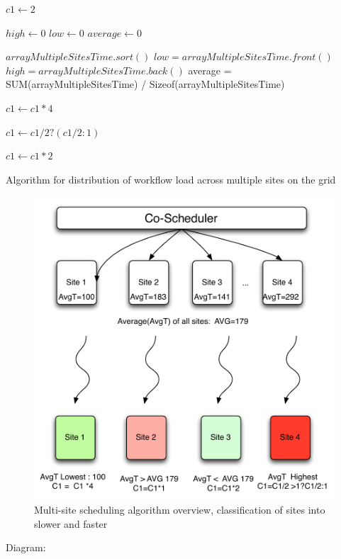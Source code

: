 \documentclass[ms,electronic,double]{nuthesis}
\begin{document}
\begin{algorithm}
\begin{algorithmic}

\STATE $c1 \gets 2$ 

\STATE $high \gets 0$
\STATE $low \gets 0$
\STATE $average \gets 0$

\STATE $arrayMultipleSitesTime.sort()$
\STATE $low = arrayMultipleSitesTime.front()$
\STATE $high = arrayMultipleSitesTime.back()$
\STATE average = SUM(arrayMultipleSitesTime) / Sizeof(arrayMultipleSitesTime)

\STATE $c1 \gets c1 * 4$
\ENDIF

\STATE $c1 \gets c1/2 ? (c1/2:1)$
\ENDIF

\STATE $c1 \gets c1 * 2$
\ENDIF

\end{algorithmic}
\caption{Algorithm for distribution of workflow load across multiple sites on the grid}
\label{alg:updateJobPropagationConstant()}
\end{algorithm}


\begin{figure}[htbp!]
\begin{center}
\includegraphics[scale=0.75]{images/multipleSites}
\caption{Multi-site scheduling algorithm overview, classification of sites into slower and faster}
\label{fig:multiSite1}
\end{center}
\end{figure}
\FloatBarrier
Diagram:
\end{document}
